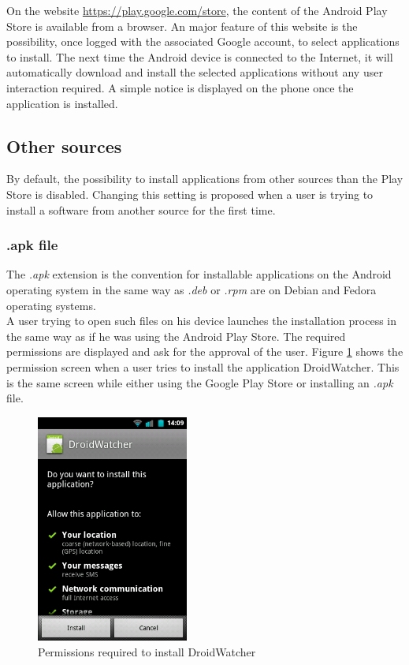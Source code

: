 On the website \url{https://play.google.com/store}, the content of the Android Play Store is available from a browser.
An major feature of this website is the possibility, once logged with the associated Google account, to select applications to install.
The next time the Android device is connected to the Internet, it will automatically download and install the selected applications without any user interaction required.
A simple notice is displayed on the phone once the application is installed.\\


\subsection{Other sources}
By default, the possibility to install applications from other sources than the Play Store is disabled.
Changing this setting is proposed when a user is trying to install a software from another source for the first time.

\subsubsection{.apk file}
The \emph{.apk} extension is the convention for installable applications on the Android operating system in the same way as \emph{.deb} or \emph{.rpm} are on Debian and Fedora operating systems.\\

A user trying to open such files on his device launches the installation process in the same way as if he was using the Android Play Store.
The required permissions are displayed and ask for the approval of the user.
Figure \ref{fig:perm-dw} shows the permission screen when a user tries to install the application DroidWatcher.
This is the same screen while either using the Google Play Store or installing an \emph{.apk} file.\\

\begin{figure}[h]
  \centering
  \includegraphics[width=5cm]{images/permissions.png}
  \caption{Permissions required to install DroidWatcher}
  \label{fig:perm-dw}
\end{figure}

